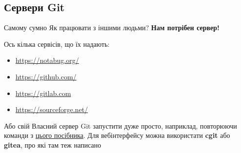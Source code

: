 \documentclass[
  ignorenonframetext,
  aspectratio=169,
]{beamer}
\providecommand{\tightlist}{%
  \setlength{\itemsep}{0pt}\setlength{\parskip}{0pt}}
\begin{document}
\hypertarget{ux441ux435ux440ux432ux435ux440ux438-git}{%
\subsection{Сервери Git}\label{ux441ux435ux440ux432ux435ux440ux438-git}}

\begin{frame}{Самому сумно}
\protect\hypertarget{ux441ux430ux43cux43eux43cux443-ux441ux443ux43cux43dux43e}{}
Як працювати з іншими людьми? \textbf{Нам потрібен сервер!}

Ось кілька сервісів, що їх надають:

\begin{itemize}
\tightlist
\item
  \url{https://notabug.org/}
\item
  \url{https://github.com/}
\item
  \url{https://gitlab.com}
\item
  \url{https://sourceforge.net/}
\end{itemize}

\pause

\begin{block}{Або свій}
\protect\hypertarget{ux430ux431ux43e-ux441ux432ux456ux439}{}
Власний сервер Git запустити дуже просто, наприклад, повторюючи команди
з \href{https://landchad.net/git/}{цього посібника}. Для вебінтерфейсу
можна використати \textbf{cgit} або \textbf{gitea}, про які там теж
написано
\end{block}
\end{frame}
\end{document}
